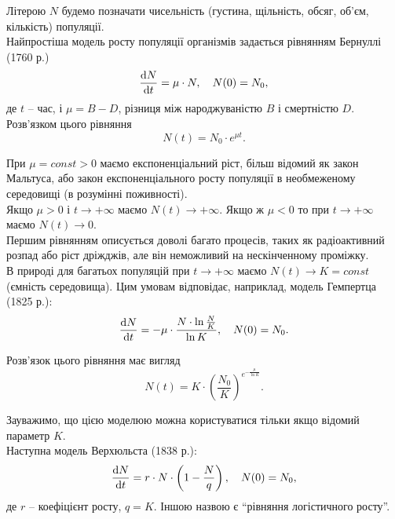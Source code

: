 Літерою $N$ будемо позначати чисельність (густина, щільність, обсяг, об'єм, кількість) популяції. \\

Найпростіша модель росту популяції організмів задається рівнянням Бернуллі (1760 р.)
\begin{equation}
    \frac{\mathop{}\!\mathrm{d} N}{\mathop{}\!\mathrm{d} t} = \mu \cdot N, \quad N(0) = N_0,
\end{equation}
де $t$ -- час, і $\mu = B - D$, різниця між народжуваністю $B$ і смертністю $D$. \\

Розв'язком цього рівняння
\begin{equation}
    N(t) = N_0 \cdot e^{\mu t}.
\end{equation}

При $\mu = const > 0$ маємо експоненціальний ріст, більш відомий як закон Мальтуса, або закон експоненціального росту популяції в необмеженому середовищі (в розумінні поживності). \\

Якщо $\mu > 0$ і $t \to + \infty$ маємо $N(t) \to + \infty$. Якщо ж $\mu < 0$ то при $t \to +\infty$ маємо $N(t) \to 0$. \\

Першим рівнянням описується доволі багато процесів, таких як радіоактивний розпад або ріст дріжджів, але він неможливий на нескінченному проміжку. \\

В природі для багатьох популяцій при $t \to + \infty$ маємо $N(t) \to K = const$ (ємність середовища). Цим умовам відповідає, наприклад, модель Гемпертца (1825 р.):
\begin{equation}
    \frac{\mathop{}\!\mathrm{d} N}{\mathop{}\!\mathrm{d} t} = - \mu \cdot \frac{N \cdot \ln \frac NK}{\ln K}, \quad N(0) = N_0.
\end{equation}

Розв'язок цього рівняння має вигляд
\begin{equation}
    N(t) = K \cdot \left( \frac{N_0}{K} \right)^{e^{- \frac{\mu}{\ln K}}}.
\end{equation}

Зауважимо, що цією моделюю можна користуватися тільки якщо відомий параметр $K$. \\

Наступна модель Верхюльста (1838 р.):
\begin{equation}
    \frac{\mathop{}\!\mathrm{d} N}{\mathop{}\!\mathrm{d} t} = r \cdot N \cdot \left( 1 - \frac{N}{q} \right), \quad N(0) = N_0,
\end{equation}
де $r$ -- коефіцієнт росту, $q = K$. Іншою назвою є ``рівняння логістичного росту''. \\

